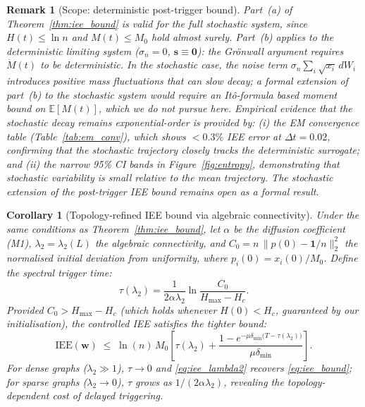 \documentclass[review,12pt]{elsarticle}
\newcommand{\bfw}{\mathbf{w}}
\newcommand{\IEE}{\mathrm{IEE}}
\newcommand{\Hc}{H_c}
\newcommand{\Hmax}{H_{\max}}
\newcommand{\lambdat}{\lambda_2}
\newtheorem{corollary}{Corollary}
\newtheorem{remark}{Remark}
\begin{document}
\begin{remark}[Scope: deterministic post-trigger bound]
\label{rem:det_bound}
Part~(a) of Theorem~\ref{thm:iee_bound} is valid for the full stochastic
system, since $H(t) \leq \ln n$ and $M(t) \leq M_0$ hold almost surely.
Part~(b) applies to the \emph{deterministic limiting system}
($\sigma_n = 0$, $\mathbf{s} \equiv \mathbf{0}$): the Grönwall argument
requires $\dot{M}(t)$ to be deterministic. In the stochastic case,
the noise term $\sigma_n\sum_i\sqrt{x_i}\,dW_i$ introduces positive mass
fluctuations that can slow decay; a formal extension of part~(b) to the
stochastic system would require an It\^{o}-formula based moment bound on
$\mathbb{E}[M(t)]$, which we do not pursue here. Empirical evidence that
the stochastic decay remains exponential-order is provided by:
(i) the EM convergence table (Table~\ref{tab:em_conv}), which shows
$<0.3\%$ IEE error at $\Delta t = 0.02$, confirming that the stochastic
trajectory closely tracks the deterministic surrogate; and
(ii) the narrow 95\% CI bands in Figure~\ref{fig:entropy}, demonstrating
that stochastic variability is small relative to the mean trajectory.
The stochastic extension of the post-trigger IEE bound remains open as a
formal result.
\end{remark}

\begin{corollary}[Topology-refined IEE bound via algebraic connectivity]
\label{cor:lambda2}
Under the same conditions as Theorem~\ref{thm:iee_bound}, let $\alpha$
be the diffusion coefficient (M1), $\lambdat = \lambda_2(L)$ the algebraic
connectivity, and $C_0 = n\,\|p(0) - \mathbf{1}/n\|_2^2$ the normalised
initial deviation from uniformity, where $p_i(0) = x_i(0)/M_0$.
Define the \emph{spectral trigger time}:
\begin{equation}
  \tau(\lambdat) = \frac{1}{2\alpha\lambdat}
    \ln\!\frac{C_0}{\Hmax - \Hc}.
  \label{eq:tau_lambda}
\end{equation}
Provided $C_0 > \Hmax - \Hc$ (which holds whenever $H(0) < \Hc$,
guaranteed by our initialisation), the controlled IEE satisfies the
tighter bound:
\begin{equation}
  \IEE(\bfw) \;\leq\; \ln(n)\,M_0\!\left[
    \tau(\lambdat) +
    \frac{1 - e^{-\mu\delta_{\min}\bigl(T - \tau(\lambdat)\bigr)}}{\mu\delta_{\min}}
  \right].
  \label{eq:iee_lambda2}
\end{equation}
For dense graphs ($\lambdat \gg 1$), $\tau \to 0$ and \eqref{eq:iee_lambda2}
recovers \eqref{eq:iee_bound}; for sparse graphs ($\lambdat \to 0$),
$\tau$ grows as $1/(2\alpha\lambdat)$, revealing the topology-dependent
cost of delayed triggering.
\end{corollary}
\end{document}
